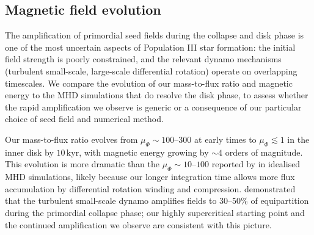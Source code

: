 \documentclass[twocolumn]{openjournal}
\newcommand{\kyr}{\,\mathrm{kyr}}
\begin{document}
\subsection{Magnetic field evolution}

The amplification of primordial seed fields during the collapse and disk phase is one of the most uncertain aspects of Population III star formation: the initial field strength is poorly constrained, and the relevant dynamo mechanisms (turbulent small-scale, large-scale differential rotation) operate on overlapping timescales.
We compare the evolution of our mass-to-flux ratio and magnetic energy to the MHD simulations that do resolve the disk phase, to assess whether the rapid amplification we observe is generic or a consequence of our particular choice of seed field and numerical method.

Our mass-to-flux ratio evolves from $\mu_\Phi \sim 100$--$300$ at
early times to $\mu_\Phi \lesssim 1$ in the inner disk by $10\kyr$,
with magnetic energy growing by $\sim 4$ orders of magnitude.
This evolution is more dramatic than the $\mu_\Phi \sim 10$--$100$
reported by \citet{machida08} in idealised MHD simulations, likely
because our longer integration time allows more flux accumulation by
differential rotation winding and compression.
\citet{higashi24} demonstrated that the turbulent small-scale dynamo
amplifies fields to 30--50\% of equipartition during the primordial
collapse phase; our highly supercritical starting point and the
continued amplification we observe are consistent with this picture.
\end{document}
